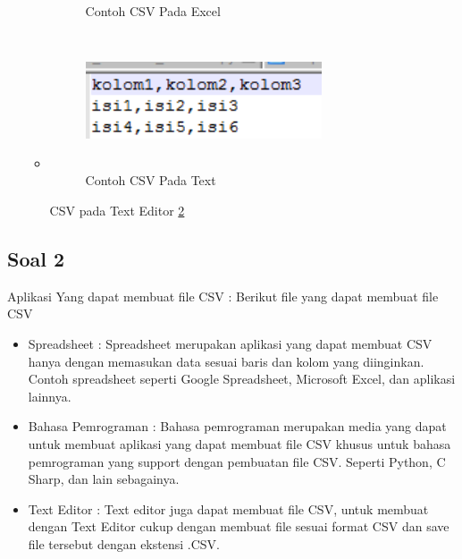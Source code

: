 \begin{itemize}
\begin{itemize}
\begin{figure}[!htbp]
								\caption{Contoh CSV Pada Excel}
								\label{1174035_CSVExcel}
							\end{figure}
							\item \begin{figure}[!htbp]
								\centering
								\includegraphics[height=4cm, width=7cm]{figures/4/1174035/Teori/1174035_CSVText.jpg}
								\caption{Contoh CSV Pada Text}
								\label{1174035_CSVText}
							\end{figure}
							CSV pada Text Editor \ref{1174035_CSVText}
							
						  \end{itemize}
\end{itemize}
\subsection{Soal 2}
Aplikasi Yang dapat membuat file CSV : 
Berikut file yang dapat membuat file CSV
\begin{itemize}
	\item Spreadsheet :
	Spreadsheet merupakan aplikasi yang dapat membuat CSV hanya dengan memasukan data sesuai baris dan kolom yang diinginkan. Contoh spreadsheet seperti Google Spreadsheet, Microsoft Excel, dan aplikasi lainnya. 
	\item Bahasa Pemrograman :
	Bahasa pemrograman merupakan media yang dapat untuk membuat aplikasi yang dapat membuat file CSV khusus untuk bahasa pemrograman yang support dengan pembuatan file CSV. Seperti Python, C Sharp, dan lain sebagainya.
	\item Text Editor :
	Text editor juga dapat membuat file CSV, untuk membuat dengan Text Editor cukup dengan membuat file sesuai format CSV dan save file tersebut dengan ekstensi .CSV.
\end{itemize}
